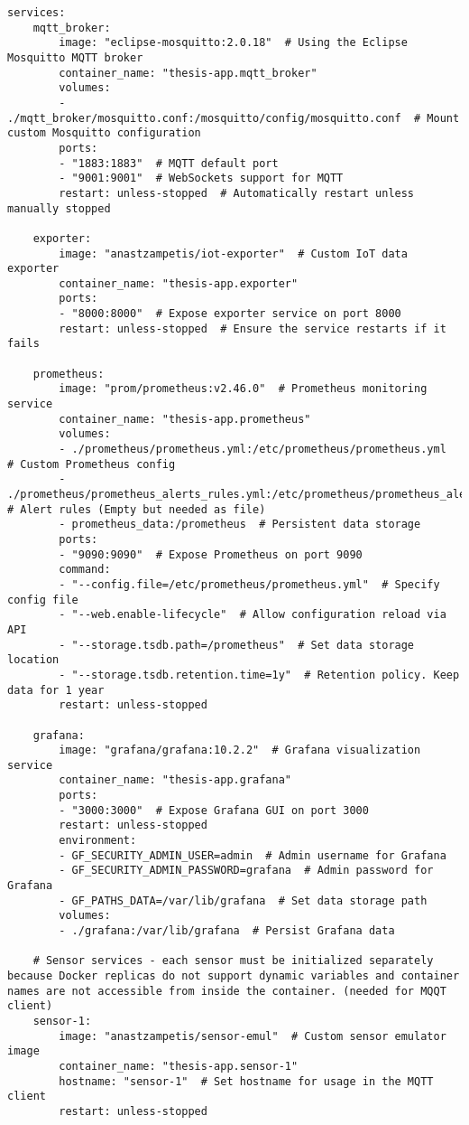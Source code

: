 \begin{verbatim}
services:
    mqtt_broker:
        image: "eclipse-mosquitto:2.0.18"  # Using the Eclipse Mosquitto MQTT broker
        container_name: "thesis-app.mqtt_broker"
        volumes: 
        - ./mqtt_broker/mosquitto.conf:/mosquitto/config/mosquitto.conf  # Mount custom Mosquitto configuration
        ports:
        - "1883:1883"  # MQTT default port
        - "9001:9001"  # WebSockets support for MQTT
        restart: unless-stopped  # Automatically restart unless manually stopped

    exporter:
        image: "anastzampetis/iot-exporter"  # Custom IoT data exporter
        container_name: "thesis-app.exporter"
        ports:
        - "8000:8000"  # Expose exporter service on port 8000
        restart: unless-stopped  # Ensure the service restarts if it fails

    prometheus:
        image: "prom/prometheus:v2.46.0"  # Prometheus monitoring service
        container_name: "thesis-app.prometheus"
        volumes:
        - ./prometheus/prometheus.yml:/etc/prometheus/prometheus.yml  # Custom Prometheus config
        - ./prometheus/prometheus_alerts_rules.yml:/etc/prometheus/prometheus_alerts_rules.yml  # Alert rules (Empty but needed as file)
        - prometheus_data:/prometheus  # Persistent data storage
        ports:
        - "9090:9090"  # Expose Prometheus on port 9090
        command:
        - "--config.file=/etc/prometheus/prometheus.yml"  # Specify config file
        - "--web.enable-lifecycle"  # Allow configuration reload via API
        - "--storage.tsdb.path=/prometheus"  # Set data storage location
        - "--storage.tsdb.retention.time=1y"  # Retention policy. Keep data for 1 year
        restart: unless-stopped  

    grafana:
        image: "grafana/grafana:10.2.2"  # Grafana visualization service
        container_name: "thesis-app.grafana"
        ports:
        - "3000:3000"  # Expose Grafana GUI on port 3000
        restart: unless-stopped 
        environment:
        - GF_SECURITY_ADMIN_USER=admin  # Admin username for Grafana
        - GF_SECURITY_ADMIN_PASSWORD=grafana  # Admin password for Grafana
        - GF_PATHS_DATA=/var/lib/grafana  # Set data storage path
        volumes:
        - ./grafana:/var/lib/grafana  # Persist Grafana data

    # Sensor services - each sensor must be initialized separately because Docker replicas do not support dynamic variables and container names are not accessible from inside the container. (needed for MQQT client)
    sensor-1:
        image: "anastzampetis/sensor-emul"  # Custom sensor emulator image
        container_name: "thesis-app.sensor-1"
        hostname: "sensor-1"  # Set hostname for usage in the MQTT client
        restart: unless-stopped 


\end{verbatim}
